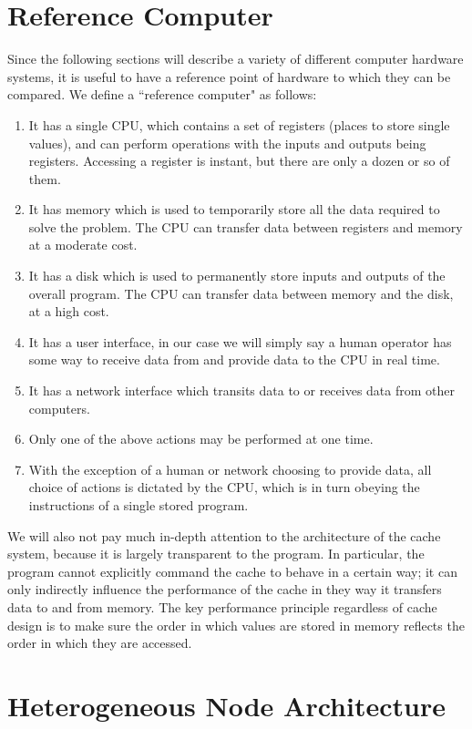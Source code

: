 \section{Reference Computer}
\label{sec:ref_comp}

Since the following sections will describe a variety
of different computer hardware systems, it is useful to have a reference
point of hardware to which they can be compared.
We define a ``reference computer" as follows:

\begin{enumerate}
\item It has a single CPU, which contains a set
of registers (places to store single values),
and can perform operations with the inputs
and outputs being registers.
Accessing a register is instant, but there are
only a dozen or so of them.
\item It has memory which is used to temporarily store
all the data required to solve the problem.
The CPU can transfer data between registers
and memory at a moderate cost.
\item It has a disk which is used to permanently store
inputs and outputs of the overall program.
The CPU can transfer data between memory
and the disk, at a high cost.
\item It has a user interface, in our case
we will simply say a human operator has
some way to receive data from and provide
data to the CPU in real time.
\item It has a network interface which transits
data to or receives data from other computers.
\item Only one of the above actions may be
performed at one time.
\item With the exception of a human or network choosing
to provide data, all choice of actions is
dictated by the CPU, which is in turn obeying
the instructions of a single stored program.
\end{enumerate}

We will also not pay much in-depth attention to the
architecture of the cache system, because it
is largely transparent to the program.
In particular, the program cannot explicitly
command the cache to behave in a certain way;
it can only indirectly influence the performance
of the cache in they way it transfers data to and
from memory.
The key performance principle regardless of cache design is
to make sure the order in which values are stored
in memory reflects the order in which they are accessed.

\section{Heterogeneous Node Architecture}
\label{sec:node_hw}

